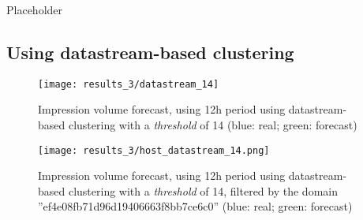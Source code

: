 Placeholder

\subsection*{Using datastream-based clustering}

\begin{figure}[!ht]
\centering
\begin{minipage}[t]{0.45\linewidth}
\texttt{[image: results\_3/datastream\_14]} 
\caption[Volume
impression forecast, domain, cluster by datastream]{Impression volume
forecast, using 12h period using datastream-based clustering with a
\emph{threshold} of 14 (blue: real; green: forecast)}
\label{fig:domain_w_datastream}

\end{minipage}
\quad
\begin{minipage}[t]{0.45\linewidth}
\texttt{[image: results\_3/host\_datastream\_14.png]} 
\caption[Volume
impression forecast, domain, cluster by datastream, filtered]{Impression volume
forecast, using 12h period using datastream-based clustering with a
\emph{threshold} of 14, filtered by the domain ''ef4e08fb71d96d19406663f8bb7ce6c0'' (blue: real; green: forecast)}
\label{fig:domain_w_datastream_filtered}

\end{minipage}

\end{figure}

